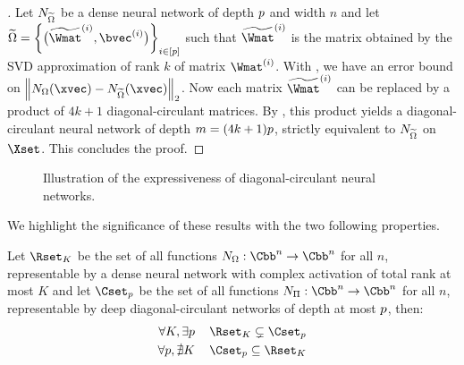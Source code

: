 \begin{proof}[]
  Let $N_{\widetilde{\Omega}}$ be a dense neural network of depth $p$ and width $n$ and let $\widetilde{\Omega} = \left\{ \big(\widetilde{\Wmat}^{(i)}, \bvec^{(i)} \big) \right\}_{i \in [\depth]}$ such that $\widetilde{\Wmat}^{(i)}$ is the matrix obtained by the SVD approximation of rank $k$ of matrix $\Wmat^{(i)}$.
  With , we have an error bound on $\norm{ \nn_\Omega (\xvec) - \nn_{\widetilde{\Omega}} (\xvec)}_2$.
  Now each matrix $\widetilde{\Wmat}^{(i)}$ can be replaced by a product of $4k+1$ diagonal-circulant matrices.
  By , this product yields a diagonal-circulant neural network of depth $m = (4k+1)p$, strictly equivalent to $N_{\widetilde{\Omega}}$ on $\Xset$.
  This concludes the proof.
\end{proof}


\begin{figure}[htb]
    \begin{center}
      
    \end{center}
    \caption{Illustration of the expressiveness of diagonal-circulant neural networks.}
    \label{figure:ch4-circfig}
\end{figure}

We highlight the significance of these results with the two following properties.
\begin{properties}
  Let $\Rset_{K}$ be the set of all functions $\nn_\Omega:\Cbb^n \rightarrow \Cbb^n$ for all $n$, representable by a dense neural network with complex \relu activation of total rank at most $K$ and let $\Cset_\depth$ be the set of all functions $\nn_\Pi:\Cbb^n \rightarrow \Cbb^n$ for all $n$, representable by deep diagonal-circulant networks of depth at most $p$, then:
  \begin{align}
    \label{property:eq1} \forall K,\exists \depth \, &\quad \Rset_{K} \subsetneq \Cset_{\depth} \\
    \label{property:eq2} \forall \depth,\nexists K\, &\quad \Cset_{\depth} \subseteq \Rset_{K}
  \end{align}
  \removespace
\end{properties}

